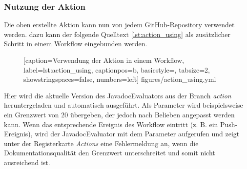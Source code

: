 \subsubsection{Nutzung der Aktion}

Die oben erstellte Aktion kann nun von jedem GitHub-Repository verwendet werden. dazu kann der folgende Quelltext \ref{lst:action_using} als zusätzlicher Schritt in einem Workflow eingebunden werden. 
\begin{figure} [htbp]

[caption={Verwendung der Aktion in einem Workflow},
label={lst:action_using},
captionpos=b, basicstyle=\footnotesize, tabsize=2, showstringspaces=false,  numbers=left]
{figures/action_using.yml}
\end{figure}

Hier wird die aktuelle Version des JavadocEvaluators aus der Branch \textit{action} heruntergeladen und automatisch ausgeführt. Als Parameter wird beispielsweise ein Grenzwert von 20 übergeben, der jedoch nach Belieben angepasst werden kann. Wenn das entsprechende Ereignis des Workflow eintritt (z. B. ein Push-Ereignis), wird der JavadocEvaluator mit dem Parameter aufgerufen und zeigt unter der Registerkarte \textit{Actions} eine Fehlermeldung an, wenn die Dokumentationsqualität den Grenzwert unterschreitet und somit nicht ausreichend ist. 
